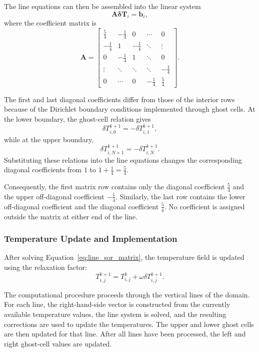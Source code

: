 The line equations can then be assembled into the linear system
\begin{equation}
\mathbf{A}\boldsymbol{\delta T}_i
=
\mathbf{b}_i,
\label{eq:line_sor_matrix}
\end{equation}
where the coefficient matrix is
\begin{equation}
\mathbf{A}
=
\begin{bmatrix}
\frac{5}{4} & -\frac{1}{4} & 0 & \cdots & 0\\
-\frac{1}{4} & 1 & -\frac{1}{4} & \ddots & \vdots\\
0 & -\frac{1}{4} & 1 & \ddots & 0\\
\vdots & \ddots & \ddots & \ddots & -\frac{1}{4}\\
0 & \cdots & 0 & -\frac{1}{4} & \frac{5}{4}
\end{bmatrix}.
\label{eq:line_sor_coefficient_matrix}
\end{equation}

The first and last diagonal coefficients differ from those of the interior rows because of the Dirichlet boundary conditions implemented through ghost cells. At the lower boundary, the ghost-cell relation gives
\[
\delta T_{i,0}^{k+1}
=
-\delta T_{i,1}^{k+1},
\]
while at the upper boundary,
\[
\delta T_{i,N+1}^{k+1}
=
-\delta T_{i,N}^{k+1}.
\]
Substituting these relations into the line equations changes the corresponding diagonal coefficients from $1$ to $1+\frac{1}{4}=\frac{5}{4}$.

Consequently, the first matrix row contains only the diagonal coefficient $\frac{5}{4}$ and the upper off-diagonal coefficient $-\frac{1}{4}$. Similarly, the last row contains the lower off-diagonal coefficient and the diagonal coefficient $\frac{5}{4}$. No coefficient is assigned outside the matrix at either end of the line.


\subsubsection{Temperature Update and Implementation}

After solving Equation~\ref{eq:line_sor_matrix}, the temperature field is updated using the relaxation factor:
\begin{equation}
T_{i,j}^{k+1}
=
T_{i,j}^{k}
+
\omega\delta T_{i,j}^{k+1}.
\label{eq:line_sor_update}
\end{equation}

The computational procedure proceeds through the vertical lines of the domain. For each line, the right-hand-side vector is constructed from the currently available temperature values, the line system is solved, and the resulting corrections are used to update the temperatures. The upper and lower ghost cells are then updated for that line. After all lines have been processed, the left and right ghost-cell values are updated.

